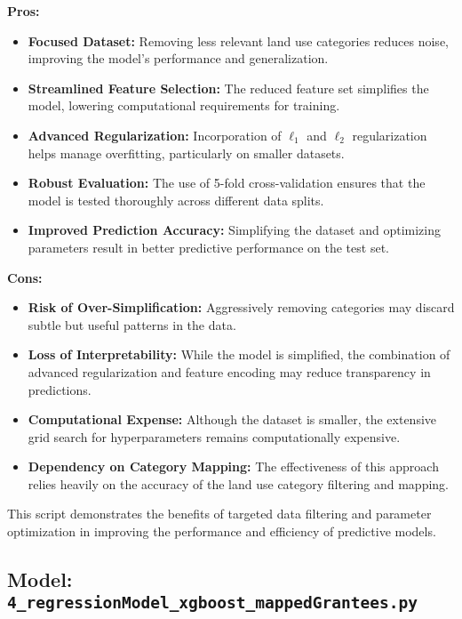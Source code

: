 \textbf{Pros:}
\begin{itemize}
    \item \textbf{Focused Dataset:} Removing less relevant land use categories reduces noise, improving the model's performance and generalization.
    \item \textbf{Streamlined Feature Selection:} The reduced feature set simplifies the model, lowering computational requirements for training.
    \item \textbf{Advanced Regularization:} Incorporation of \(\ell_1\) and \(\ell_2\) regularization helps manage overfitting, particularly on smaller datasets.
    \item \textbf{Robust Evaluation:} The use of 5-fold cross-validation ensures that the model is tested thoroughly across different data splits.
    \item \textbf{Improved Prediction Accuracy:} Simplifying the dataset and optimizing parameters result in better predictive performance on the test set.
\end{itemize}

\textbf{Cons:}
\begin{itemize}
    \item \textbf{Risk of Over-Simplification:} Aggressively removing categories may discard subtle but useful patterns in the data.
    \item \textbf{Loss of Interpretability:} While the model is simplified, the combination of advanced regularization and feature encoding may reduce transparency in predictions.
    \item \textbf{Computational Expense:} Although the dataset is smaller, the extensive grid search for hyperparameters remains computationally expensive.
    \item \textbf{Dependency on Category Mapping:} The effectiveness of this approach relies heavily on the accuracy of the land use category filtering and mapping.
\end{itemize}

This script demonstrates the benefits of targeted data filtering and parameter optimization in improving the performance and efficiency of predictive models. \\

\hrulefill

\subsection{Model: \texttt{4\_regressionModel\_xgboost\_mappedGrantees.py}}

